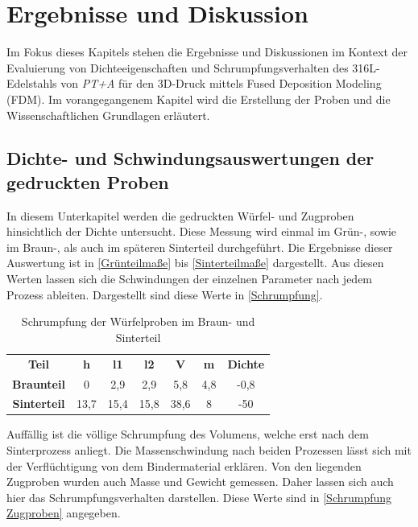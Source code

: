 \chapter{Ergebnisse und Diskussion}

Im Fokus dieses Kapitels stehen die Ergebnisse und Diskussionen im Kontext der Evaluierung von Dichteeigenschaften und Schrumpfungsverhalten des 316L-Edelstahls von \textit{PT+A} für den 3D-Druck mittels Fused Deposition Modeling (FDM). Im vorangegangenem Kapitel wird die Erstellung der Proben und die Wissenschaftlichen Grundlagen erläutert.

\section{Dichte- und Schwindungsauswertungen der gedruckten Proben}

In diesem Unterkapitel werden die gedruckten Würfel- und Zugproben hinsichtlich der Dichte untersucht. Diese Messung wird einmal im Grün-, sowie im Braun-, als auch im späteren Sinterteil durchgeführt. Die Ergebnisse dieser Auswertung ist in \autoref{Grünteilmaße} bis \autoref{Sinterteilmaße} dargestellt.
Aus diesen Werten lassen sich die Schwindungen der einzelnen Parameter nach jedem Prozess ableiten. Dargestellt sind diese Werte in \autoref{Schrumpfung}.

\begin{table}[h]
    \centering
    \caption{Schrumpfung der Würfelproben im Braun- und Sinterteil}
      \begin{tabular}{ccccccc}
      \toprule
      \textbf{Teil} & \multicolumn{1}{c}{\textbf{h}} & \multicolumn{1}{c}{\textbf{l1}} & \multicolumn{1}{c}{\textbf{l2}} & \multicolumn{1}{c}{\textbf{V}} & \multicolumn{1}{c}{\textbf{m}} & \multicolumn{1}{c}{\textbf{Dichte}} \\
        \textbf{Braunteil} & 0 & 2,9 & 2,9 & 5,8 & 4,8 & -0,8 \\
        \textbf{Sinterteil} & 13,7 & 15,4 & 15,8 & 38,6 & 8 & -50 \\
      \bottomrule
      \end{tabular}%
    \label{Schrumpfung}%
  \end{table}%
  \FloatBarrier

Auffällig ist die völlige Schrumpfung des Volumens, welche erst nach dem Sinterprozess anliegt. Die Massenschwindung nach beiden Prozessen lässt sich mit der Verflüchtigung von dem Bindermaterial erklären. 
Von den liegenden Zugproben wurden auch Masse und Gewicht gemessen. Daher lassen sich auch hier das Schrumpfungsverhalten darstellen. Diese Werte sind in \autoref{Schrumpfung Zugproben} angegeben.


